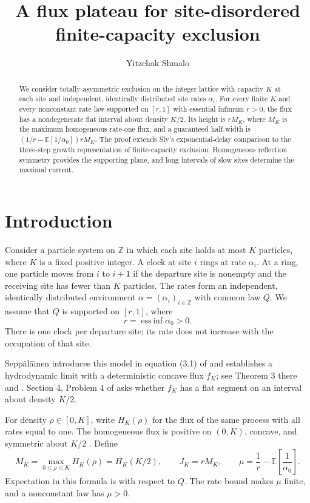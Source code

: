 \documentclass[11pt]{amsart}
\title{A flux plateau for site-disordered finite-capacity exclusion}
\author{Yitzchak Shmalo}
\date{}
\theoremstyle{remark}
\newcommand{\EE}{\mathbb E}
\newcommand{\ZZ}{\mathbb Z}
\DeclareMathOperator*{\essinf}{ess\,inf}
\numberwithin{equation}{section}
\begin{document}
\begin{abstract}
We consider totally asymmetric exclusion on the integer lattice with capacity
$K$ at each site and independent, identically distributed site rates $\alpha_i$.
For every finite $K$ and every nonconstant rate law supported on $[r,1]$
with essential infimum $r>0$, the flux has a nondegenerate flat interval about density $K/2$.
Its height is $rM_K$, where $M_K$ is the maximum homogeneous rate-one flux,
and a guaranteed half-width is
$(1/r-\EE[1/\alpha_0])rM_K$.
The proof extends Sly's exponential-delay comparison to the three-step growth
representation of finite-capacity exclusion. Homogeneous reflection symmetry
provides the supporting plane, and long intervals of slow sites determine
the maximal current.
\end{abstract}
\maketitle

\section{Introduction}

Consider a particle system on $\ZZ$ in which each site holds at most $K$
particles, where $K$ is a fixed positive integer. A clock at site $i$ rings
at rate $\alpha_i$. At a ring, one particle moves from $i$ to $i+1$ if the
departure site is nonempty and the receiving site has fewer than $K$
particles. The rates form an independent, identically distributed
environment $\alpha=(\alpha_i)_{i\in\ZZ}$ with common law $Q$. We assume
that $Q$ is supported on $[r,1]$, where
\[
 r=\essinf\alpha_0>0.
\]
There is one clock per departure site; its rate does not increase with the
occupation of that site.

Sepp\"al\"ainen introduces this model in equation (3.1) of
\cite{SeppSurvey} and establishes a hydrodynamic limit with a deterministic
concave flux $f_K$; see Theorem 3 there and \cite{SeppHydro}.
Section 4, Problem 4 of \cite{SeppSurvey} asks whether $f_K$ has a flat
segment on an interval about density $K/2$.

For density $\rho\in[0,K]$, write $H_K(\rho)$ for the flux of the same
process with all rates equal to one.
The homogeneous flux is positive on $(0,K)$, concave, and symmetric about
$K/2$ \cite[Theorem 9.5]{SeppNotes}. Define
\begin{equation}\label{eq:constants}
 M_K=\max_{0\leq\rho\leq K}H_K(\rho)=H_K(K/2),\qquad
 J_K=rM_K,\qquad
 \mu=\frac1r-\EE\!\left[\frac1{\alpha_0}\right].
\end{equation}
Expectation in this formula is with respect to $Q$. The rate bound makes
$\mu$ finite, and a nonconstant law has $\mu>0$.
\end{document}
